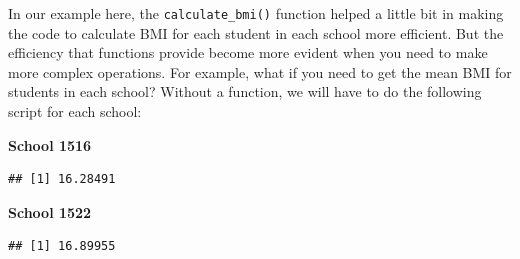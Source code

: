 \documentclass[
  12pt,
]{book}
\newenvironment{Shaded}{\begin{snugshade}}{\end{snugshade}}
\newcommand{\DecValTok}[1]{\textcolor[rgb]{0.00,0.00,0.81}{#1}}
\newcommand{\DocumentationTok}[1]{\textcolor[rgb]{0.56,0.35,0.01}{\textbf{\textit{#1}}}}
\newcommand{\FunctionTok}[1]{\textcolor[rgb]{0.00,0.00,0.00}{#1}}
\newcommand{\NormalTok}[1]{#1}
\newcommand{\OtherTok}[1]{\textcolor[rgb]{0.56,0.35,0.01}{#1}}
\newcommand{\SpecialCharTok}[1]{\textcolor[rgb]{0.00,0.00,0.00}{#1}}
\begin{document}
In our example here, the \texttt{calculate\_bmi()} function helped a little bit in making the code to calculate BMI for each student in each school more efficient. But the efficiency that functions provide become more evident when you need to make more complex operations. For example, what if you need to get the mean BMI for students in each school? Without a function, we will have to do the following script for each school:

\textbf{School 1516}

\begin{Shaded}
\end{Shaded}

\begin{verbatim}
## [1] 16.28491
\end{verbatim}

\textbf{School 1522}

\begin{Shaded}
\end{Shaded}

\begin{verbatim}
## [1] 16.89955
\end{verbatim}
\end{document}
